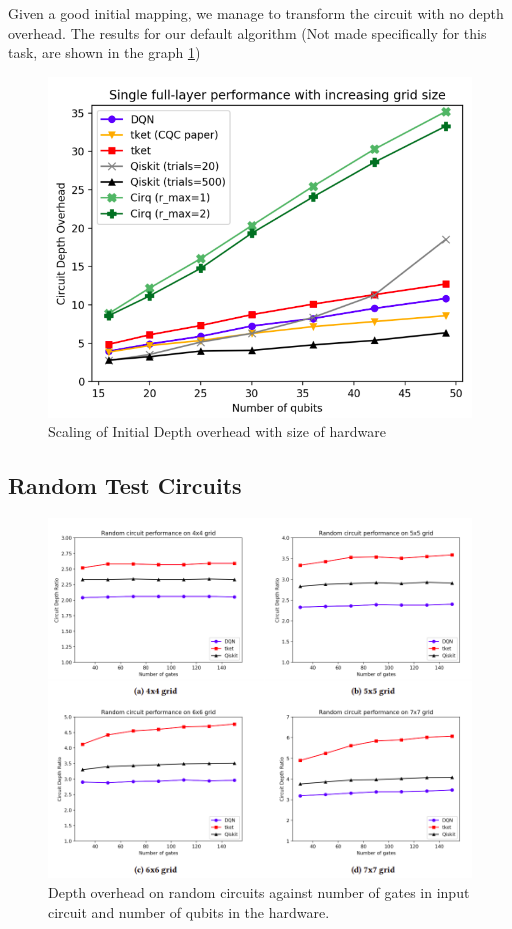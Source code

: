 \documentclass[%
 reprint,
 amsmath,amssymb,
 aps,
]{revtex4-2}
\begin{document}
Given a good initial mapping, we manage to transform the circuit with no depth overhead. The results for our default algorithm (Not made specifically for this task, are shown in the graph \ref{fig:results-full})

\begin{figure}[H]
    \includegraphics[width=\linewidth]{images/results-full.png}
    \caption{\label{fig:results-full}
        Scaling of Initial Depth overhead with size of hardware}
\end{figure}

\subsection{\label{sec:results-random}Random Test Circuits}

\begin{figure}[H]
    \includegraphics[width=\linewidth]{images/results-random.png}
    \caption{\label{fig:results-random}
        Depth overhead on random circuits against number of gates in input circuit and number of qubits in the hardware.}
\end{figure}
\end{document}
